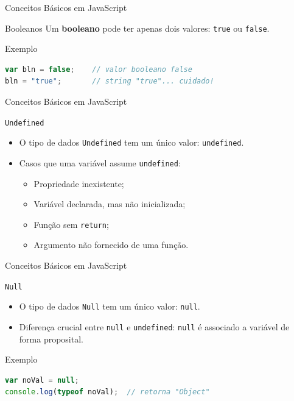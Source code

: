 \documentclass[xcolor=dvipsnames,table]{beamer}
\begin{document}
\begin{frame}[fragile]{Conceitos Básicos em JavaScript}
	\begin{block}{Booleanos}
		Um {\bf booleano} pode ter apenas dois valores: {\tt true} ou {\tt false}.
	\end{block} \pause
	\begin{block}{Exemplo}
		\begin{lstlisting}[language=JavaScript]
var bln = false;	// valor booleano false
bln = "true";		// string "true"... cuidado!
\end{lstlisting}	
	\end{block}
\end{frame}

\begin{frame}[fragile]{Conceitos Básicos em JavaScript}
	\begin{block}{\tt Undefined}
		\begin{itemize}
			\item O tipo de dados {\tt Undefined} tem um único valor: {\tt undefined}. \pause
			\item Casos que uma variável assume {\tt undefined}: \pause
				\begin{itemize}
					\item Propriedade inexistente; \pause
					\item Variável declarada, mas não inicializada; \pause
					\item Função sem {\tt return}; \pause
					\item Argumento não fornecido de uma função.
				\end{itemize}
		\end{itemize}
	\end{block} 
\end{frame}

\begin{frame}[fragile]{Conceitos Básicos em JavaScript}
	\begin{block}{\tt Null}
		\begin{itemize}
			\item O tipo de dados {\tt Null} tem um único valor: {\tt null}. \pause
			\item Diferença crucial entre {\tt null} e {\tt undefined}: {\tt null} é associado a variável de forma proposital.
		\end{itemize}	
	\end{block} \pause
	\begin{block}{Exemplo}
		\begin{lstlisting}[language=JavaScript]
var noVal = null;
console.log(typeof noVal);	// retorna "Object"
\end{lstlisting}	
	\end{block}
\end{frame}
\end{document}
